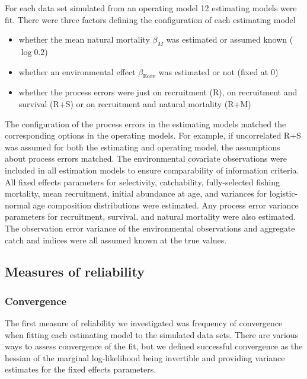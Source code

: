 \documentclass[
  12pt,
]{article}
\begin{document}
For each data set simulated from an operating model 12 estimating models
were fit. There were three factors defining the configuration of each
estimating model

\begin{itemize}
\item whether the mean natural mortality $\beta_M$ was estimated or assumed known ($\log 0.2$)
\item whether an environmental effect $\beta_\text{Ecov}$ was estimated or not (fixed at 0)
\item whether the process errors were just on recruitment (R), on recruitment and survival (R+S) or on recruitment and natural mortality (R+M)
\end{itemize}

The configuration of the process errors in the estimating models matched
the corresponding options in the operating models. For example, if
uncorrelated R+S was assumed for both the estimating and operating
model, the assumptions about process errors matched. The environmental
covariate observations were included in all estimation models to ensure
comparability of information criteria. All fixed effects parameters for
selectivity, catchability, fully-selected fishing mortality, mean
recruitment, initial abundance at age, and variances for logistic-normal
age composition distributions were estimated. Any process error variance
parameters for recruitment, survival, and natural mortality were also
estimated. The observation error variance of the environmental
observations and aggregate catch and indices were all assumed known at
the true values.

\hypertarget{measures-of-reliability}{%
\subsection*{Measures of reliability}\label{measures-of-reliability}}

\hypertarget{convergence}{%
\subsubsection*{Convergence}\label{convergence}}

The first measure of reliability we investigated was frequency of
convergence when fitting each estimating model to the simulated data
sets. There are various ways to assess convergence of the fit, but we
defined successful convergence as the hessian of the marginal
log-likelihood being invertible and providing variance estimates for the
fixed effects parameters.
\end{document}
